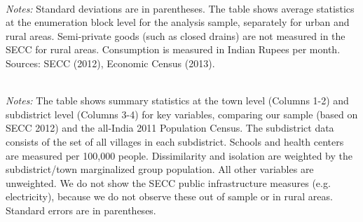 \documentclass[12pt]{article}
\newcommand{\segpath}{/Users/f0018fb/Dropbox/tmp/segdata/out}
\begin{document}
  \clearpage



  \begin{table}[H]
	  \caption{Neighborhood Summary Statistics}
    \label{tab:sum_stats}
    \begin{center}
		  \scalebox{1}{}
    \end{center}
    \\
  \footnotesize{\noindent \textit{Notes:} Standard deviations are in parentheses. The table shows average statistics at the enumeration block level for the analysis sample, separately for urban and rural areas. Semi-private goods (such as closed drains) are not measured in the SECC for rural areas. Consumption is measured in Indian Rupees per month. Sources: SECC (2012), Economic Census (2013).}
  \end{table}

  \clearpage
  
  \begin{table}[H]
	  \caption{Sample Representativeness for Towns and Rural Subdistricts}
    \label{tab:sample_rep}
    \begin{center}
		  \scalebox{0.9}{}
    \end{center}
    \\
  \footnotesize{\noindent \textit{Notes:} The table shows summary statistics at the town level (Columns 1-2) and subdistrict level (Columns 3-4) for key variables, comparing our sample (based on SECC 2012) and the all-India 2011 Population Census. The subdistrict data consists of the set of all villages in each subdistrict. Schools and health centers are measured per 100,000 people. Dissimilarity and isolation are weighted by the subdistrict/town marginalized group population. All other variables are unweighted. We do not show the SECC public infrastructure measures (e.g. electricity), because we do not observe these out of sample or in rural areas. Standard errors are in parentheses.}
  \end{table}
    
  \clearpage
  
\end{document}
